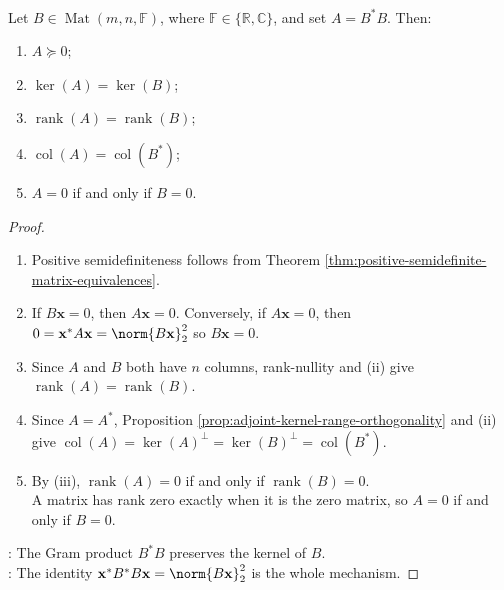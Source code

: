 \begin{theorem} \label{thm:gram-factor-kernel-rank-column-data} \\
Let $B\in\operatorname{Mat}(m,n,\mathbb{F})$, where $\mathbb{F}\in\{\mathbb{R},\mathbb{C}\}$, and set $A=B^*B$. Then:
\begin{enumerate}[label=(\roman*)]
\setlength{\itemsep}{0pt}
\item $A\succeq0$;
\item $\ker(A)=\ker(B)$;
\item $\operatorname{rank}(A)=\operatorname{rank}(B)$;
\item $\operatorname{col}(A)=\operatorname{col}(B^*)$;
\item $A=0$ if and only if $B=0$.
\end{enumerate}
\begin{proof}
\begin{enumerate}[label=(\roman*)]
\setlength{\itemsep}{0pt}
\item Positive semidefiniteness follows from Theorem \ref{thm:positive-semidefinite-matrix-equivalences}.
\item If $B\mathbf{x}=0$, then $A\mathbf{x}=0$. Conversely, if $A\mathbf{x}=0$, then $0=\mathbf{x}^*A\mathbf{x}=\norm{B\mathbf{x}}_2^2$ so $B\mathbf{x}=0$.
\item Since $A$ and $B$ both have $n$ columns, rank-nullity and (ii) give $\operatorname{rank}(A)=\operatorname{rank}(B)$.
\item Since $A=A^*$, Proposition \ref{prop:adjoint-kernel-range-orthogonality} and (ii) give $\operatorname{col}(A)=\ker(A)^{\perp}=\ker(B)^{\perp}=\operatorname{col}(B^*)$.
\item By (iii), $\operatorname{rank}(A)=0$ if and only if $\operatorname{rank}(B)=0$.\\
A matrix has rank zero exactly when it is the zero matrix, so $A=0$ if and only if $B=0$.
\end{enumerate}
: The Gram product $B^*B$ preserves the kernel of $B$.\\
: The identity $\mathbf{x}^*B^*B\mathbf{x}=\norm{B\mathbf{x}}_2^2$ is the whole mechanism.
\end{proof}
\end{theorem}

